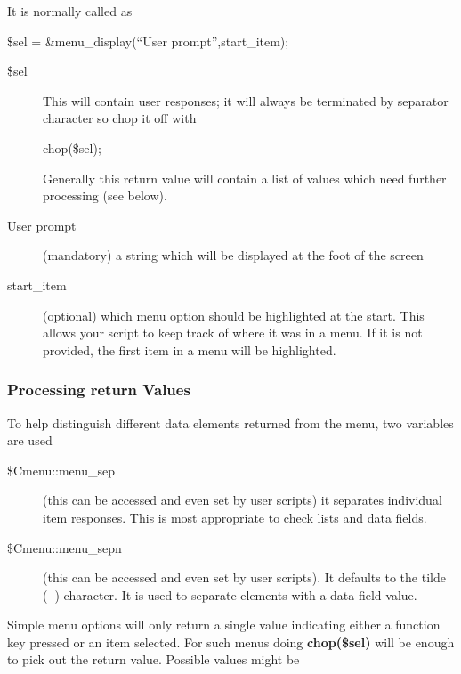 \documentclass[a4paper,abstracton]{article}
\begin{document}
It is normally called as

\begin{center}
\$sel = \&menu\_display(``User prompt'',start\_item);
\end{center} 

\begin{description} 
\item [\$sel] This will contain user responses; it will always be terminated by separator character so chop it off with
\begin{center}
chop(\$sel);
\end{center}
Generally this return value will contain a list of values which need further processing (see below).
\item [User prompt] (mandatory) a string which will be displayed at the foot of the screen
\item [start\_item] (optional) which menu option should be highlighted at the start. This allows your script to keep track of where it was in a menu. If it is not provided, the first item in a menu will be highlighted.
\end{description}

\subsubsection{Processing return Values}

To help distinguish different data elements returned from the menu, two variables are used
\begin{description}
\item [\$Cmenu::menu\_sep] (this can be accessed and even set by user scripts) it separates individual item responses. This is most appropriate to check lists and data fields. 

\item [\$Cmenu::menu\_sepn] (this can be accessed and even set by user scripts). It defaults to the tilde (\textbf{~}) character. It is used to separate elements with a data field value.
\end{description}

Simple menu options will only return a single value indicating either a function key pressed or an item selected. For such menus doing \textbf{chop(\$sel)} will be enough to pick out the return value. Possible values might be
\end{document}
